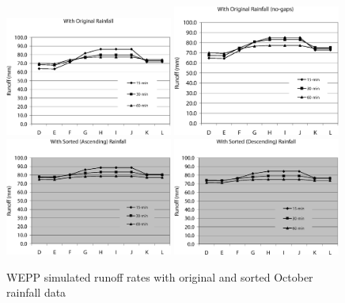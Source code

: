 \begin{figure}[htbp]
  \centering
    \includegraphics[width=0.49\textwidth]{./img/wepp_runoff_with_original}
    \includegraphics[width=0.49\textwidth]
{./img/wepp_runoff_with_original_nogap}\\[5mm]
    \includegraphics[width=0.49\textwidth]{./img/wepp_runoff_with_sorted_asc}
    \includegraphics[width=0.49\textwidth]{./img/wepp_runoff_with_sorted_des}
  \caption{WEPP simulated runoff rates with original and sorted October rainfall
data}
  \label{fig:wepp_runoff_results}
\end{figure}

